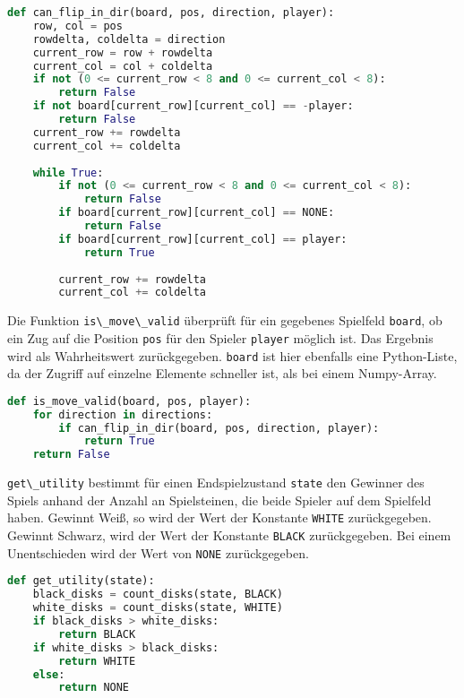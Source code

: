 \begin{lstlisting}[language=Python]
def can_flip_in_dir(board, pos, direction, player):
    row, col = pos
    rowdelta, coldelta = direction
    current_row = row + rowdelta
    current_col = col + coldelta
    if not (0 <= current_row < 8 and 0 <= current_col < 8):
        return False
    if not board[current_row][current_col] == -player:
        return False
    current_row += rowdelta
    current_col += coldelta
    
    while True:
        if not (0 <= current_row < 8 and 0 <= current_col < 8):
            return False
        if board[current_row][current_col] == NONE:
            return False           
        if board[current_row][current_col] == player:
            return True
    
        current_row += rowdelta
        current_col += coldelta
\end{lstlisting}

Die Funktion \passthrough{\lstinline!is\_move\_valid!} überprüft für ein
gegebenes Spielfeld \passthrough{\lstinline!board!}, ob ein Zug auf die
Position \passthrough{\lstinline!pos!} für den Spieler
\passthrough{\lstinline!player!} möglich ist. Das Ergebnis wird als
Wahrheitswert zurückgegeben. \passthrough{\lstinline!board!} ist hier
ebenfalls eine Python-Liste, da der Zugriff auf einzelne Elemente
schneller ist, als bei einem Numpy-Array.

\begin{lstlisting}[language=Python]
def is_move_valid(board, pos, player):
    for direction in directions:
        if can_flip_in_dir(board, pos, direction, player):
            return True
    return False
\end{lstlisting}

\passthrough{\lstinline!get\_utility!} bestimmt für einen
Endspielzustand \passthrough{\lstinline!state!} den Gewinner des Spiels
anhand der Anzahl an Spielsteinen, die beide Spieler auf dem Spielfeld
haben. Gewinnt Weiß, so wird der Wert der Konstante
\passthrough{\lstinline!WHITE!} zurückgegeben. Gewinnt Schwarz, wird der
Wert der Konstante \passthrough{\lstinline!BLACK!} zurückgegeben. Bei
einem Unentschieden wird der Wert von \passthrough{\lstinline!NONE!}
zurückgegeben.

\begin{lstlisting}[language=Python]
def get_utility(state):
    black_disks = count_disks(state, BLACK)
    white_disks = count_disks(state, WHITE)
    if black_disks > white_disks:
        return BLACK
    if white_disks > black_disks:
        return WHITE
    else:
        return NONE
\end{lstlisting}

